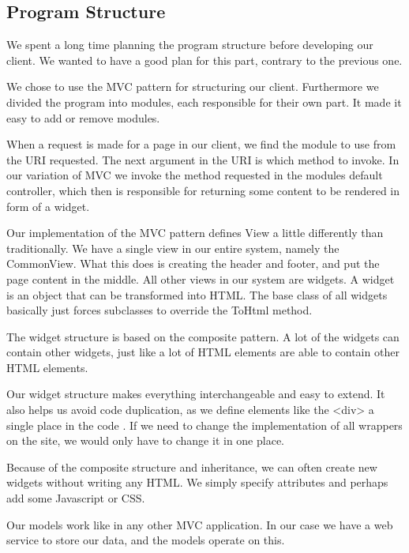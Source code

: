\subsection{Program Structure}
We spent a long time planning the program structure before developing our client. We wanted to have a good plan for this part, contrary to the previous one.

We chose to use the MVC pattern for structuring our client.
Furthermore we divided the program into modules, each responsible for their own part. It made it easy to add or remove modules.

When a request is made for a page in our client, we find the module to use from the URI requested.
The next argument in the URI is which method to invoke. In our variation of MVC we invoke the method requested in the modules default controller, which then  is responsible for returning some content to be rendered in form of a widget.

Our implementation of the MVC pattern defines View a little differently than traditionally.
We have a single view in our entire system, namely the CommonView.
What this does is creating the header and footer, and put the page content in the middle.
All other views in our system are widgets. A widget is an object that can be transformed into HTML.
The base class of all widgets basically just forces subclasses to override the ToHtml method.

The widget structure is based on the composite pattern. A lot of the widgets can contain other widgets, just like a lot of HTML elements are able to contain other HTML elements.

Our widget structure makes everything interchangeable and easy to extend. It also helps us avoid code duplication, as we define elements like the <div> a single place in the code . If we need to change the implementation of all wrappers on the site, we would only have to change it in one place.

Because of the composite structure and inheritance, we can often create new widgets without writing any HTML. We simply specify attributes and perhaps add some Javascript or CSS.

Our models work like in any other MVC application. In our case we have a web service to store our data, and the models operate on this.
\newpage